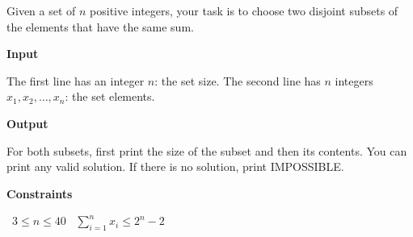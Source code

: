 Given a set of $n$ positive integers, your task is to choose two disjoint subsets of the elements that have the same sum.

\vspace{0.3cm}\noindent\textbf{Input}

The first line has an integer $n$: the set size.
The second line has $n$ integers $x_1,x_2,\dots,x_n$: the set elements.

\vspace{0.3cm}\noindent\textbf{Output}

For both subsets, first print the size of the subset and then its contents. You can print any valid solution. If there is no solution, print IMPOSSIBLE.

\vspace{0.3cm}\noindent\textbf{Constraints}

\textbullet\ $3 \le n \le 40$
\textbullet\ $\sum_{i=1}^{n} x_i \le 2^{n}-2$
